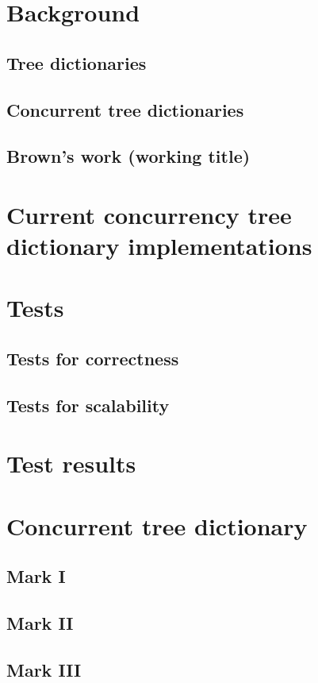 \documentclass{article}
\begin{document}
\section{Background}
\subsection{Tree dictionaries}
\subsection{Concurrent tree dictionaries}
\subsection{Brown's work (working title)}

\section{Current concurrency tree dictionary implementations}

\section{Tests }
\subsection{Tests for correctness}
\subsection{Tests for scalability}

\section{Test results}


\section{Concurrent tree dictionary}
\subsection{Mark I}
\subsection{Mark II}
\subsection{Mark III}
\end{document}
